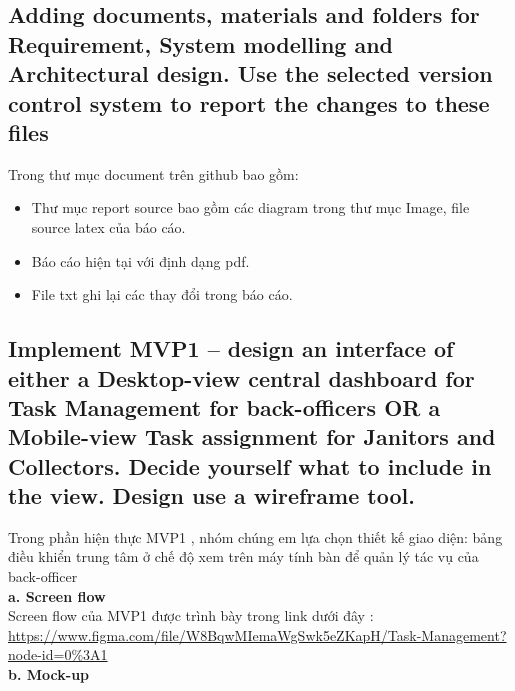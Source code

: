 \documentclass[a4paper]{article}
\begin{document}
\subsection{Adding documents, materials and folders for Requirement, System modelling and Architectural design. Use the selected version control system to report the changes to these files}
Trong thư mục document trên github bao gồm: 
\begin{itemize}
    \item Thư mục report source bao gồm các diagram trong thư mục Image, file source latex của báo cáo.
    \item Báo cáo hiện tại với định dạng pdf.
    \item File txt ghi lại các thay đổi trong báo cáo.
\end{itemize}
\subsection{Implement MVP1 – design an interface of either a Desktop-view central dashboard for Task Management for back-officers OR a Mobile-view Task assignment for Janitors and Collectors. Decide yourself what to include in  the view. Design use a wireframe tool. }
Trong phần hiện thực MVP1 , nhóm chúng em lựa chọn thiết kế giao diện:  bảng điều khiển trung tâm ở chế độ xem trên máy tính bàn để quản lý tác vụ của back-officer\\
\textbf{a. Screen flow} \\
Screen flow của MVP1 được trình bày trong link dưới đây : \\
\url{https://www.figma.com/file/W8BqwMIemaWgSwk5eZKapH/Task-Management?node-id=0\%3A1}
\\
\textbf{b. Mock-up}
\end{document}
